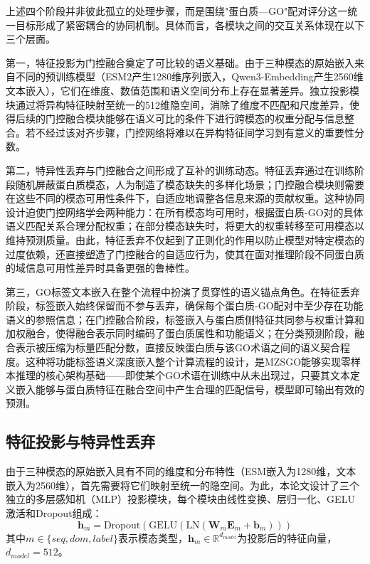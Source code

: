 上述四个阶段并非彼此孤立的处理步骤，而是围绕"蛋白质—GO"配对评分这一统一目标形成了紧密耦合的协同机制。具体而言，各模块之间的交互关系体现在以下三个层面。

第一，特征投影为门控融合奠定了可比较的语义基础。由于三种模态的原始嵌入来自不同的预训练模型（ESM2产生1280维序列嵌入，Qwen3-Embedding产生2560维文本嵌入），它们在维度、数值范围和语义空间分布上存在显著差异。独立投影模块通过将异构特征映射至统一的512维隐空间，消除了维度不匹配和尺度差异，使得后续的门控融合模块能够在语义可比的条件下进行跨模态的权重分配与信息整合。若不经过该对齐步骤，门控网络将难以在异构特征间学习到有意义的重要性分数。

第二，特异性丢弃与门控融合之间形成了互补的训练动态。特征丢弃通过在训练阶段随机屏蔽蛋白质模态，人为制造了模态缺失的多样化场景；门控融合模块则需要在这些不同的模态可用性条件下，自适应地调整各信息来源的贡献权重。这种协同设计迫使门控网络学会两种能力：在所有模态均可用时，根据蛋白质-GO对的具体语义匹配关系合理分配权重；在部分模态缺失时，将更大的权重转移至可用模态以维持预测质量。由此，特征丢弃不仅起到了正则化的作用以防止模型对特定模态的过度依赖，还直接塑造了门控融合的自适应行为，使其在面对推理阶段不同蛋白质的域信息可用性差异时具备更强的鲁棒性。

第三，GO标签文本嵌入在整个流程中扮演了贯穿性的语义锚点角色。在特征丢弃阶段，标签嵌入始终保留而不参与丢弃，确保每个蛋白质-GO配对中至少存在功能语义的参照信息；在门控融合阶段，标签嵌入与蛋白质侧特征共同参与权重计算和加权融合，使得融合表示同时编码了蛋白质属性和功能语义；在分类预测阶段，融合表示被压缩为标量匹配分数，直接反映蛋白质与该GO术语之间的语义契合程度。这种将功能标签语义深度嵌入整个计算流程的设计，是MZSGO能够实现零样本推理的核心架构基础——即使某个GO术语在训练中从未出现过，只要其文本定义嵌入能够与蛋白质特征在融合空间中产生合理的匹配信号，模型即可输出有效的预测。

\subsection{特征投影与特异性丢弃}

由于三种模态的原始嵌入具有不同的维度和分布特性（ESM嵌入为1280维，文本嵌入为2560维），首先需要将它们映射至统一的隐空间。为此，本论文设计了三个独立的多层感知机（MLP）投影模块，每个模块由线性变换、层归一化\cite{ba2016layer}、GELU激活\cite{hendrycks2016gaussian}和Dropout组成：
\begin{equation}
    \mathbf{h}_m = \text{Dropout}(\text{GELU}(\text{LN}(\mathbf{W}_m \mathbf{E}_m + \mathbf{b}_m)))
\end{equation}
其中$m \in \{seq, dom, label\}$表示模态类型，$\mathbf{h}_m \in \mathbb{R}^{d_{model}}$为投影后的特征向量，$d_{model} = 512$。

